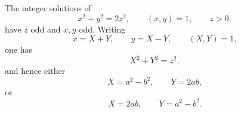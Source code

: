 \begin{proposition}
The integer solutions of
\[
    x^2+y^2=2z^2,\qquad (x,y)=1,\qquad z>0,
\]
have $z$ odd and $x,y$ odd. Writing
\[
    x=X+Y,\qquad y=X-Y,\qquad (X,Y)=1,
\]
one has
\[
    X^2+Y^2=z^2,
\]
and hence either
\[
    X=a^2-b^2,\qquad Y=2ab,
\]
or
\[
    X=2ab,\qquad Y=a^2-b^2.
\]
\end{proposition}
